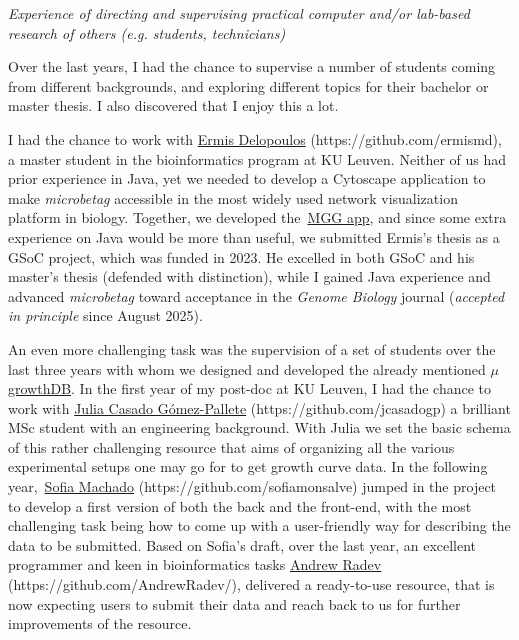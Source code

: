 \textit{
    Experience of directing and supervising practical computer and/or lab-based research 
    of others (e.g. students, technicians)
}

    Over the last years, I had the chance to supervise a number of students coming from different backgrounds,
    and exploring different topics for their bachelor or master thesis.
    I also discovered that I enjoy this a lot. 

    I had the chance to work with \href{https://github.com/ermismd}{Ermis Delopoulos}
    (https://github.com/ermismd), 
    a master student in the bioinformatics program at KU Leuven.
    Neither of us had prior experience in Java, yet we needed to develop a Cytoscape application 
    to make \textit{microbetag} accessible in the most widely used network visualization platform in biology. 
    Together, we developed the~\href{https://apps.cytoscape.org/apps/mgg}{MGG app}, and since some extra experience
    on Java would be more than useful, we submitted Ermis's thesis as a GSoC project, 
    which was funded in 2023. 
    He excelled in both GSoC and his master's thesis (defended with distinction), 
    while I gained Java experience and advanced \textit{microbetag} toward acceptance in 
    the \textit{Genome Biology} journal (\textit{accepted in principle} since August 2025).
    
    An even more challenging task was the supervision of a set of students over the last three years
    with whom we designed and developed the already mentioned 
    \href{https://mgrowthdb.gbiomed.kuleuven.be/}{{$\mu$}growthDB}.
    In the first year of my post-doc at KU Leuven, I had the chance to work with
    \href{https://github.com/jcasadogp}{Julia Casado Gómez-Pallete}
    (https://github.com/jcasadogp)
    a brilliant MSc student with an engineering background. 
    With Julia we set the basic schema of this rather challenging resource that aims of organizing 
    all the various experimental setups one may go for to get growth curve data.
    In the following year,~\href{https://github.com/sofiamonsalve}{Sofia Machado} 
    (https://github.com/sofiamonsalve)
    jumped in the project 
    to develop a first version of both the back and the front-end, with the most challenging task
    being how to come up with a user-friendly way for describing the data to be submitted. 
    Based on Sofia's draft, over the last year, an excellent programmer and keen in bioinformatics tasks
    \href{https://github.com/AndrewRadev/}{Andrew Radev}
    (https://github.com/AndrewRadev/), 
    delivered a ready-to-use resource, that is now 
    expecting users to submit their data and reach back to us for further improvements of the resource. 

